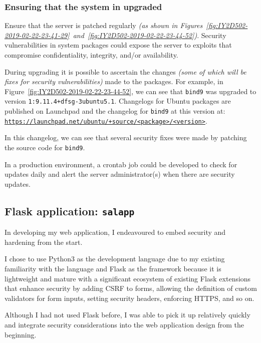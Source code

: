 \subsubsection{Ensuring that the system in upgraded}
Ensure that the server is patched regularly \textit{(as shown in Figures~\ref{fig:IY2D502-2019-02-22-23-41-29}~and~\ref{fig:IY2D502-2019-02-22-23-44-52})}. Security vulnerabilities in system packages could expose the server to exploits that compromise confidentiality, integrity, and/or availability.

During upgrading it is possible to ascertain the changes \textit{(some of which will be fixes for security vulnerabilities)} made to the packages. For example, in Figure~\ref{fig:IY2D502-2019-02-22-23-44-52}, we can see that \texttt{bind9} was upgraded to version \texttt{1:9.11.4+dfsg-3ubuntu5.1}. Changelogs for Ubuntu packages are published on Launchpad and the changelog for \texttt{bind9} at this version at:\\
\href{https://launchpad.net/ubuntu/+source/bind9/1:9.11.4+dfsg-3ubuntu5.1}{\texttt{https://launchpad.net/ubuntu/+source/<package>/<version>}}.

In this changelog, we can see that several security fixes were made by patching the source code for \texttt{bind9}.

In a production environment, a crontab job could be developed to check for updates daily and alert the server administrator(s) when there are security updates.

\pagebreak
\subsection{Flask application: \texttt{salapp}}
In developing my web application, I endeavoured to embed security and hardening from the start.

I chose to use Python3 as the development language due to my existing familiarity with the language and Flask as the framework because it is lightweight and mature with a significant ecosystem of existing Flask extensions that enhance security by adding CSRF to forms, allowing the definition of custom validators for form inputs, setting security headers, enforcing HTTPS, and so on.

Although I had not used Flask before, I was able to pick it up relatively quickly and integrate security considerations into the web application design from the beginning.

